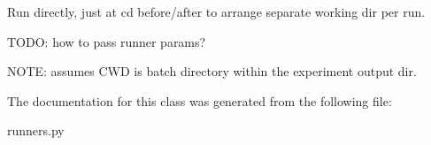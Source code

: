 \begin{DoxyVerb}Run directly, just at cd before/after to arrange separate working
dir per run.

TODO: how to pass runner params?

NOTE: assumes CWD is batch directory within the experiment output dir.
\end{DoxyVerb}
 

The documentation for this class was generated from the following file\+:\begin{DoxyCompactItemize}
\item 
runners.\+py\end{DoxyCompactItemize}
